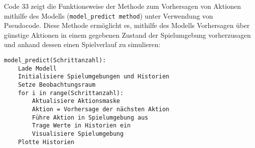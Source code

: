 \begin{minipage}{\linewidth}
Code 33 zeigt die Funktionsweise der Methode zum Vorhersagen von Aktionen mithilfe des Modells (\texttt{model\_predict method}) unter Verwendung von Pseudocode. Diese Methode ermöglicht es, mithilfe des Modells Vorhersagen über günstige Aktionen in einem gegebenen Zustand der Spielumgebung vorherzusagen und anhand dessen einen Spielverlauf zu simulieren:
\vspace{0.5cm}
\begin{lstlisting}[caption={Methode zum Vorhersagen von Aktionen mithilfe des Modells},morekeywords={Schrittanzahl}]
model_predict(Schrittanzahl):
	Lade Modell
	Initialisiere Spielumgebungen und Historien
	Setze Beobachtungsraum
	for i in range(Schrittanzahl):
		Aktualisiere Aktionsmaske
		Aktion = Vorhersage der nächsten Aktion
		Führe Aktion in Spielumgebung aus
		Trage Werte in Historien ein
		Visualisiere Spielumgebung
	Plotte Historien
\end{lstlisting}
\end{minipage}